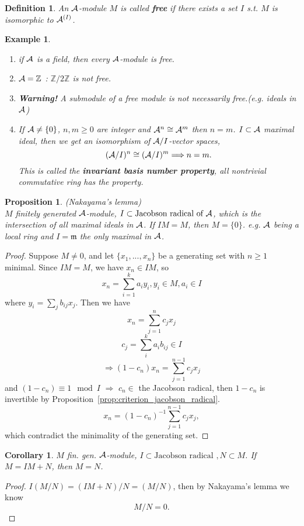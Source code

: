 \documentclass[11pt]{article}
\newtheorem{prop}[thm]{Proposition}
\newtheorem{cor}[thm]{Corollary}
\newtheorem{dfn}[thm]{Definition}
\newtheorem{ex}[thm]{Example}
\newcommand{\intg}{\mathbb Z}
\newcommand{\scm}{{\mathfrak m}}
\newcommand{\cala}{{\cal A}}
\newcommand{\Lrta}{\Longrightarrow}
\begin{document}
\begin{dfn}
An $\cala$-module $M$ is called \textbf{free} if there exists a set $I$ s.t. $M$ is isomorphic to $\cala^{(I)}$.
\end{dfn}
\begin{ex}\ 
\begin{enumerate}
\item if $\cala$ is a field, then every $\cala$-module is free.
\item $\cala=\intg$ : $\intg/2\intg$ is not free.
\item \textbf{Warning!} A submodule of a free module is not necessarily free.(e.g. ideals in $\cala$)
\item If $\cala\neq \{0\}$, $n,m\geq 0$ are integer and $\cala^n\cong \cala^m$ then $n=m$.
$I\subset \cala$ maximal ideal, then we get an isomorphism of $\cala/I$-vector spaces,
$$
(\cala/I)^n\cong(\cala/I)^m\Lrta n=m.
$$
This is called the \textbf{invariant basis number property}, all nontrivial commutative ring has the property. 
\end{enumerate}
\end{ex}

\begin{prop}\label{lem:Nakayama}
(Nakayama's lemma)\\
$M$ finitely generated $\cala$-module, $I\subset \text{Jacobson radical of $\cala$}$, which is the intersection of all maximal ideals in $\cala$.
If $IM=M$, then $M=\{0\}$. e.g. 
$\cala$ being a local ring and $I=\scm$ the only maximal in $\cala$.
\end{prop}

\begin{proof}
Suppose $M\neq {0}$, and let $\{x_1,...,x_n\}$ be a generating set with $n\geq1$ minimal.
Since $IM=M$, we have $x_n\in IM$, so
$$
x_n=\sum_{i=1}^k
a_i y_i, y_i\in M, a_i\in I
$$
where $y_i=\sum_j b_{ij }x_j$.
Then we have 
$$
x_n=\sum_{j=1}^n c_j x_j
$$
$$
c_j=\sum_i^k a_i b_{ij}\in I
$$
$$
\Lrta (1-c_n)x_n=\sum_{j=1}^{n-1}c_j x_j
$$ 
and
$(1-c_n)\equiv 1\mod I$ $\Lrta$ $c_n\in$ the Jacobson radical, then  $1-c_n$ is invertible by Proposition~\ref{prop:criterion_jacobson_radical}.
$$
x_n=(1-c_n)^{-1}\sum_{j=1}^{n-1}c_j x_j,
$$ 
which contradict the minimality of the generating set.
\end{proof}

\begin{cor}
$M$ fin. gen. $\cala$-module, $I \subset \text{Jacobson radical }, N\subset M$. If $M=IM +N$, then $M=N$.
\end{cor}
\begin{proof}
$I(M/N)=(IM+N)/N=(M/N)$, then by Nakayama's lemma we know 
$$
M/N={0}.
$$
\end{proof}
\end{document}
